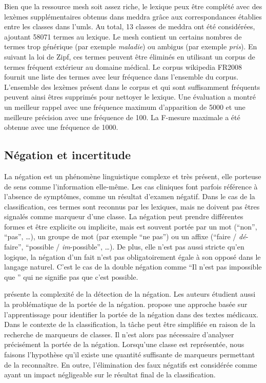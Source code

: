 Bien que la ressource \gls{mesh} soit assez riche, le lexique peux être complété avec des lexèmes supplémentaires obtenus dans \gls{meddra} grâce aux correspondances établies entre les classes dans l'\gls{umls}.
Au total, \num{13} classes de \gls{meddra} ont été considérées, ajoutant \num{58071} termes au lexique.
Le \gls{mesh} contient un certains nombres de termes trop générique (par exemple \emph{maladie}) ou ambigus (par exemple \emph{pris}).
En suivant la loi de Zipf, ces termes peuvent être éliminés en utilisant un corpus de termes fréquent extérieur au domaine médical.
Le corpus \gls{wikipedia} FR2008 \cite{REDACCorpusTexte2008} fournit une liste des termes avec leur fréquence dans l'ensemble du corpus.
L'ensemble des lexèmes présent dans le corpus et qui sont suffisamment fréquents peuvent ainsi êtres supprimés pour nettoyer le lexique.
Une évaluation a montré un meilleur rappel avec une fréquence maximum d'apparition de \num{5000} et une meilleure précision avec une fréquence de \num{100}.
La F-mesure maximale a été obtenue avec une fréquence de \num{1000}.

\subsection{Négation et incertitude}
\label{sec:class:neg}
La négation est un phénomène linguistique complexe et très présent, elle porteuse de sens comme l'information elle-même.
Les cas cliniques font parfois référence à l'absence de symptômes, comme un résultat d'examen négatif.
Dans le cas de la classification, ces termes sont reconnus par les lexiques, mais ne doivent pas êtres signalés comme marqueur d'une classe.
La négation peut prendre différentes formes et être explicite ou implicite, mais est souvent portée par un mot (\enquote{non}, \enquote{pas}, \dots), un groupe de mot (par exemple \enquote{ne \textelp{} pas}) ou un affixe (\enquote{faire / \emph{dé}-faire}, \enquote{possible / \emph{im}-possible}, \dots).
De plus, elle n'est pas aussi stricte qu'en logique, la négation d'un fait n'est pas obligatoirement égale à son opposé dans le langage naturel.
C'est le cas de la double négation comme \enquote{Il n'est pas impossible que \textelp{}} qui ne signifie pas que c'est possible.

\cite{blancoIssuesDetectingNegation2011} présente la complexité de la détection de la négation.
Les auteurs étudient aussi la problématique de la portée de la négation.
\cite{moranteLearningScopeNegation2008} propose une approche basée sur l'apprentissage pour identifier la portée de la négation dans des textes médicaux.
Dans le contexte de la classification, la tâche peut être simplifiée en raison de la recherche de marqueurs de classes.
Il n'est alors pas nécessaire d'analyser précisément la portée de la négation.
Lorsqu'une classe est représentée, nous faisons l'hypothèse qu'il existe une quantité suffisante de marqueurs permettant de la reconnaître.
En outre, l'élimination des faux négatifs est considérée comme ayant un impact négligeable sur le résultat final de la classification.

